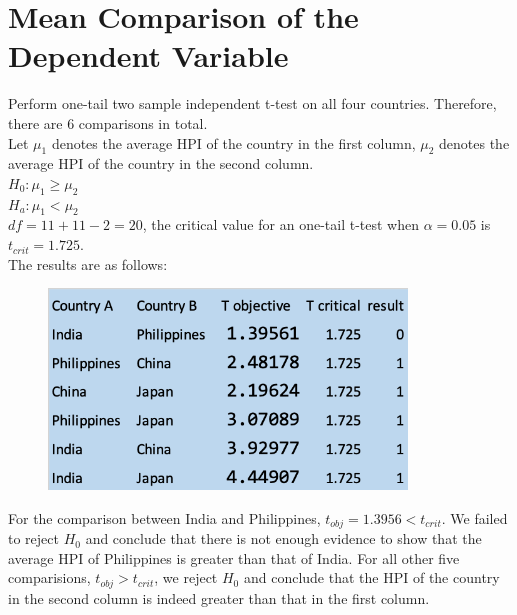 \documentclass[11pt]{article}
\begin{document}
\section{Mean Comparison of the Dependent Variable}\label{mean_comparison}
Perform one-tail two sample independent t-test on all four countries. Therefore, there are 6 comparisons in total.\\
Let $\mu_1$ denotes the average HPI of the country in the first column, $\mu_2$ denotes the average HPI of the country in the second column.\\
$H_0: \mu_1\geq \mu_2$\\
$H_a: \mu_1< \mu_2$\\
$df=11+11-2=20$, the critical value for an one-tail t-test when $\alpha=0.05$ is $t_{crit}=1.725$.\\
The results are as follows:
\begin{figure}[H]
\begin{center}
    \includegraphics[width=0.85\textwidth]{./image/TTest.png}
\end{center}
\end{figure}

For the comparison between India and Philippines, $t_{obj}=1.3956<t_{crit}$. We failed to reject $H_0$ and conclude that there is not enough evidence to show that the average HPI of Philippines is greater than that of India. For all other five comparisions, $t_{obj}>t_{crit}$, we reject $H_0$ and conclude that the HPI of the country in the second column is indeed greater than that in the first column.
\end{document}
